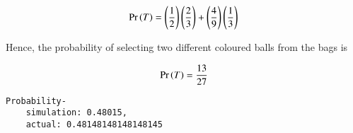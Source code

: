 \documentclass[journal,12pt,twocolumn]{IEEEtran}
\begin{document}
\begin{align}
    \Pr\left(T\right)=\left(\frac{1}{2}\right)\left(\frac{2}{3}\right)+\left(\frac{4}{9}\right)\left(\frac{1}{3}\right)
\end{align}

Hence, the probability of selecting two different coloured balls from the bags is

\begin{align}
    \Pr\left(T\right)=\frac{13}{27}
\end{align}

\vspace{0.2in}

\begin{lstlisting}
Probability-
    simulation: 0.48015,
    actual: 0.48148148148148145
\end{lstlisting}
\end{document}

